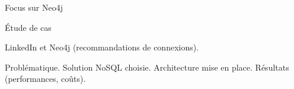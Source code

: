 \begin{frame}{Focus sur Neo4j}

\end{frame}

\begin{frame}{Étude de cas}

    LinkedIn et Neo4j (recommandations de connexions).

    Problématique.
    Solution NoSQL choisie.
    Architecture mise en place.
    Résultats (performances, coûts).

\end{frame}

